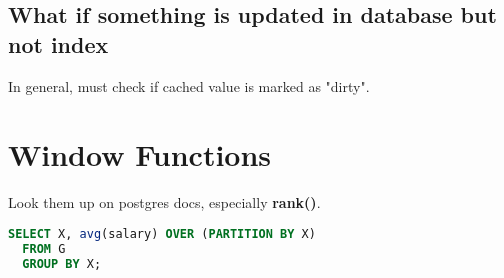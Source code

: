 \documentclass[12pt]{article}
\begin{document}
\subsection{What if something is updated in database but not index}
In general, must check if cached value is marked as "dirty".
\section{Window Functions}
Look them up on postgres docs, especially \textbf{rank()}.\\
\begin{lstlisting}[language=sql,caption=rank example]
  SELECT X, avg(salary) OVER (PARTITION BY X)
  FROM G
  GROUP BY X;
\end{lstlisting}
\end{document}
